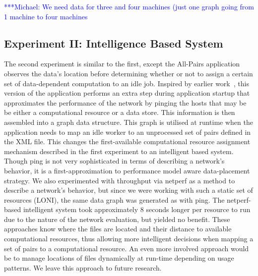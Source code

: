 \documentclass{rspublic}
\newcommand{\micnote}[1]{ {\textcolor{blue} { ***Michael: #1 }}}
\newcommand{\betynote}[1]{ {\textcolor{orange} { ***Bety: #1 }}}
\newcommand{\jhanote}[1]{} \newcommand{\micnote}[1]{}\newcommand{\betynote}[1]{} \newcommand{\fixme}[1]{}
\begin{document}
\jhanote{We need data for compute (comparison) and I/O (only) for
different data-set sizes} \micnote{We need data for three and four
machines (just one graph going from 1 machine to four machines}

\subsection{Experiment II: Intelligence Based System}
The second experiment is similar to the first, except the All-Pairs
application observes the data's location before determining whether or
not to assign a certain set of data-dependent computation to an idle
job. Inspired by earlier work~\citep{netperf}, this version of the
application performs an extra step during application startup that
approximates the performance of the network by pinging the hosts that
may be be either a computational resource or a data store. This
information is then assembled into a graph data structure. This graph
is utilised at runtime when the application needs to map an idle worker
to an unprocessed set of pairs defined in the XML file. This changes the
first-available computational resource assignment mechanism described in
the first experiment to an intelligent based system. Though ping is not
very sophisticated in terms of describing a network's behavior, it is a
first-approximation to performance model aware data-placement strategy.
We also experimented with throughput via netperf \citep{netperf_web} as
a method to describe a network's behavior, but since we were working
with such a static set of resources (LONI), the same data graph was
generated as with ping. The netperf-based intelligent system took
approximately 8 seconds longer per resource to run due to the nature of
the network evaluation, but yielded no benefit. These approaches know
where the files are located and their distance to available
computational resources, thus allowing more intelligent decisions when
mapping a set of pairs to a computational resource. An even more
involved approach would be to manage locations of files dynamically at
run-time depending on usage patterns. We leave this approach to future
research.
\end{document}

